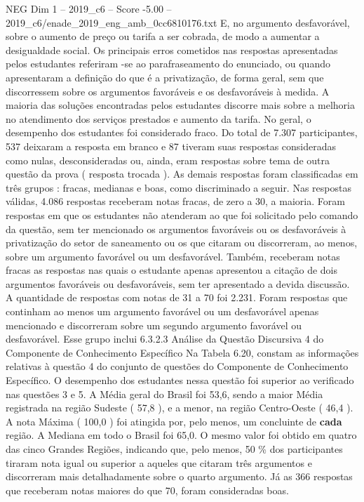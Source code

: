 \begin{textsample}{NEG Dim 1 – 2019\_c6 – Score -5.00 – 2019\_c6/enade\_2019\_eng\_amb\_0cc6810176.txt}
E, no argumento desfavorável, sobre o aumento de preço ou tarifa a ser cobrada, de modo a aumentar a desigualdade social.
Os principais erros cometidos nas respostas apresentadas pelos estudantes referiram -se ao parafraseamento do enunciado, ou quando apresentaram a definição do que é a privatização, de forma geral, sem que discorressem sobre os argumentos favoráveis e os desfavoráveis à medida.
A maioria das soluções encontradas pelos estudantes discorre mais sobre a melhoria no atendimento dos serviços prestados e aumento da tarifa.
No geral, o desempenho dos estudantes foi considerado fraco.
Do total de 7.307 participantes, 537 deixaram a resposta em branco e 87 tiveram suas respostas consideradas como nulas, desconsideradas ou, ainda, eram respostas sobre tema de outra questão da prova ( resposta trocada ).
As demais respostas foram classificadas em três grupos : fracas, medianas e boas, como discriminado a seguir.
Nas respostas válidas, 4.086 respostas receberam notas fracas, de zero a 30, a maioria.
Foram respostas em que os estudantes não atenderam ao que foi solicitado pelo comando da questão, sem ter mencionado os argumentos favoráveis ou os desfavoráveis à privatização do setor de saneamento ou os que citaram ou discorreram, ao menos, sobre um argumento favorável ou um desfavorável.
Também, receberam notas fracas as respostas nas quais o estudante apenas apresentou a citação de dois argumentos favoráveis ou desfavoráveis, sem ter apresentado a devida discussão.
A quantidade de respostas com notas de 31 a 70 foi 2.231.
Foram respostas que continham ao menos um argumento favorável ou um desfavorável apenas mencionado e discorreram sobre um segundo argumento favorável ou desfavorável.
Esse grupo inclui 6.3.2.3 Análise da Questão Discursiva 4 do Componente de Conhecimento Específico Na Tabela 6.20, constam as informações relativas à questão 4 do conjunto de questões do Componente de Conhecimento Específico.
O desempenho dos estudantes nessa questão foi superior ao verificado nas questões 3 e 5.
A Média geral do Brasil foi 53,6, sendo a maior Média registrada na região Sudeste ( 57,8 ), e a menor, na região Centro-Oeste ( 46,4 ).
A nota Máxima ( 100,0 ) foi atingida por, pelo menos, um concluinte de \textbf{cada} região.
A Mediana em todo o Brasil foi 65,0.
O mesmo valor foi obtido em quatro das cinco Grandes Regiões, indicando que, pelo menos, 50 \% dos participantes tiraram nota igual ou superior a aqueles que citaram três argumentos e discorreram mais detalhadamente sobre o quarto argumento.
Já as 366 respostas que receberam notas maiores do que 70, foram consideradas boas.

\end{textsample}
